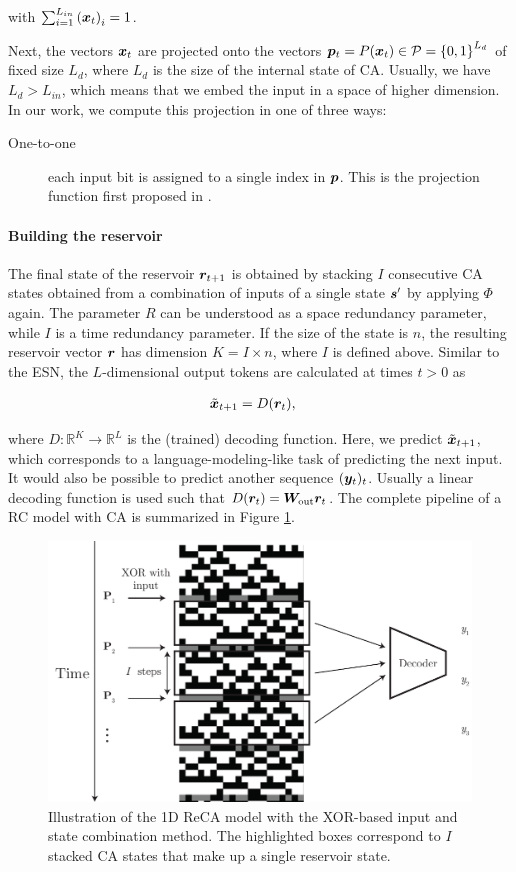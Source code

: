 with
$\sum_{i = 1}^{L_{in}}{({\bm{x}}_{t})}_{i} = 1$.

Next, the vectors ${\bm{x}}_{t}$ are projected onto the vectors
${\bm{p}}_{t} = P({\bm{x}}_{t}) \in \mathcal{P} = {\{0, 1\}}^{L_{d}}$ of fixed size $L_{d}$, where
$L_{d}$ is the size of the internal state of \ac{CA}. Usually, we have
$L_{d} > L_{in}$, which means that we embed the input in a space of higher
dimension. In our work, we compute this projection in one of three ways:

\begin{description}
  \item[One-to-one] each input bit is assigned to a single index in ${\bm{p}}$.
        This is the projection function first proposed in
        \textcite{yilmazReservoirComputingUsing2014}.
\end{description}

\paragraph{Building the reservoir}
The final state of the reservoir ${\bm{r}}_{t + 1}$ is obtained by stacking $I$ consecutive
CA states obtained from a combination of inputs of a single state ${\bm{s}}'$ by applying $\Phi$
again. The parameter $R$ can be understood as a space redundancy parameter,
while $I$ is a time redundancy parameter. If the size of the state is $n$, the
resulting reservoir vector ${\bm{r}}$ has dimension $K = I \times n$, where $I$ is
defined above. Similar to the \ac{ESN}, the $L$-dimensional output tokens are
calculated at times $t > 0$ as

\begin{equation}
  \begin{aligned}
    \tilde{{\bm{x}}}_{t+ 1} & = D({\bm{r}}_{t}),
  \end{aligned}
\end{equation}

where $D: \mathbb{R}^{K} \rightarrow \mathbb{R}^{L}$ is the (trained) decoding function. Here, we predict
$\tilde{{\bm{x}}}_{t+1}$, which corresponds to a language-modeling-like task of
predicting the next input. It would also be possible to predict another sequence
$({\bm{y}}_{t})_{t}$. Usually a linear decoding function is used such that
$D({\bm{r}}_{t}) = {\bm{W}}_{\text{out}}{\bm{r}}_{t}$. The complete pipeline of a \ac{RC} model
with \ac{CA} is summarized in Figure \ref{fig:reca-schema}.

\begin{figure}[htbp]
  \centering
  \includegraphics[width=.6\linewidth]{figures/reca_schema.pdf}
  \caption{Illustration of the 1D ReCA model with the XOR-based input and
    state combination method. The highlighted boxes correspond to $I$ stacked \ac{CA} 
    states that make up a single reservoir state.}\label{fig:reca-schema}
\end{figure}
